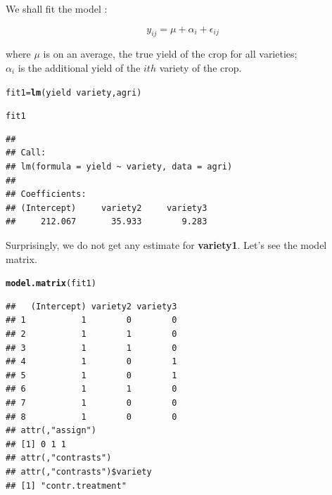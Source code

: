 \documentclass[11pt, a4paper]{article}\usepackage[]{graphicx}\usepackage[]{xcolor}
\makeatletter
\newcommand{\hlopt}[1]{\textcolor[rgb]{0,0,0}{#1}}%
\newcommand{\hlstd}[1]{\textcolor[rgb]{0.345,0.345,0.345}{#1}}%
\newcommand{\hlkwb}[1]{\textcolor[rgb]{0.69,0.353,0.396}{#1}}%
\newcommand{\hlkwd}[1]{\textcolor[rgb]{0.737,0.353,0.396}{\textbf{#1}}}%
\newenvironment{kframe}{%
 \def\at@end@of@kframe{}%
 \ifinner\ifhmode%
  \def\at@end@of@kframe{\end{minipage}}%
  \begin{minipage}{\columnwidth}%
 \fi\fi%
 \def\FrameCommand##1{\hskip\@totalleftmargin \hskip-\fboxsep
 \colorbox{shadecolor}{##1}\hskip-\fboxsep
     \hskip-\linewidth \hskip-\@totalleftmargin \hskip\columnwidth}%
 \MakeFramed {\advance\hsize-\width
   \@totalleftmargin\z@ \linewidth\hsize
   \@setminipage}}%
 {\par\unskip\endMakeFramed%
 \at@end@of@kframe}
\newenvironment{knitrout}{}{} %
\makeatother
\begin{document}
We shall fit the model :

$$y_{ij} = \mu + \alpha_i + \epsilon_{ij}$$

where $\mu$ is on an average, the true yield of the crop for all varieties; \\

$\alpha_i$ is the additional yield of the $ith$ variety of the crop.

\begin{knitrout}
\color{fgcolor}\begin{kframe}
\begin{alltt}
\hlstd{fit1} \hlkwb{=} \hlkwd{lm}\hlstd{(yield} \hlopt{~} \hlstd{variety, agri)}
\end{alltt}
\end{kframe}
\end{knitrout}

\begin{knitrout}
\color{fgcolor}\begin{kframe}
\begin{alltt}
\hlstd{fit1}
\end{alltt}
\begin{verbatim}
## 
## Call:
## lm(formula = yield ~ variety, data = agri)
## 
## Coefficients:
## (Intercept)     variety2     variety3  
##     212.067       35.933        9.283
\end{verbatim}
\end{kframe}
\end{knitrout}

Surprisingly, we do not get any estimate for \textbf{variety1}. Let's see the model matrix.
\begin{knitrout}
\color{fgcolor}\begin{kframe}
\begin{alltt}
\hlkwd{model.matrix}\hlstd{(fit1)}
\end{alltt}
\begin{verbatim}
##   (Intercept) variety2 variety3
## 1           1        0        0
## 2           1        1        0
## 3           1        1        0
## 4           1        0        1
## 5           1        0        1
## 6           1        1        0
## 7           1        0        0
## 8           1        0        0
## attr(,"assign")
## [1] 0 1 1
## attr(,"contrasts")
## attr(,"contrasts")$variety
## [1] "contr.treatment"
\end{verbatim}
\end{kframe}
\end{knitrout}
\end{document}
